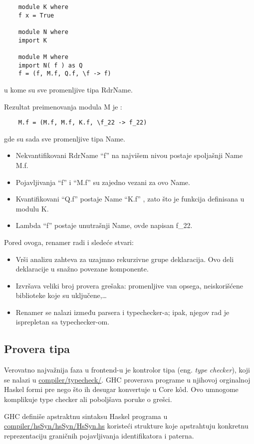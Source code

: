 \begin{verbatim}
	module K where
	f x = True
	
	module N where
	import K
	
	module M where
	import N( f ) as Q
	f = (f, M.f, Q.f, \f -> f)
\end{verbatim}
u kome su sve promenljive tipa RdrName. 

Rezultat preimenovanja modula M je :
\begin{verbatim}
	M.f = (M.f, M.f, K.f, \f_22 -> f_22)
\end{verbatim} 
gde su sada sve promenljive tipa Name.
\begin{itemize}
	\item Nekvantifikovani RdrName “f” na najvišem nivou postaje spoljašnji Name M.f.
	\item Pojavljivanja “f” i  “M.f” su zajedno vezani za ovo Name.
	\item Kvantifikovani “Q.f” postaje Name “K.f” , zato što je funkcija definisana u modulu K.
	\item Lambda “f” postaje unutrašnji Name, ovde napisan f\_22.
\end{itemize}

Pored ovoga, renamer radi i sledeće stvari:
\begin{itemize}
	\item Vrši analizu zahteva za uzajmno rekurzivne grupe deklaracija. Ovo deli deklaracije u snažno povezane komponente.
	\item Izvršava veliki broj provera grešaka: promenljive van opsega, neiskorišćene biblioteke koje su uključene,\ldots
	\item Renamer se nalazi između parsera i typechecker-a; ipak, njegov rad je isprepletan sa typechecker-om.
\end{itemize}

\subsection{Provera tipa}
\label{subsec:podnaslovTypecheck}

Verovatno najvažnija faza u frontend-u je kontrolor tipa (eng. \emph{type checker}), koji se nalazi u \underline{compiler/typecheck/}. GHC proverava programe u njihovoj orginalnoj Haskel formi pre nego što ih desugar konvertuje u Core k\^{o}d. Ovo umnogome komplikuje type checker ali poboljšava poruke o grešci.

GHC definiše apstraktnu sintaksu Haskel programa u \\ \underline{compiler/hsSyn/hsSyn/HsSyn.hs}  koristeći strukture koje apstrahtuju konkretnu reprezentaciju graničnih pojavljivanja identifikatora i paterna.

